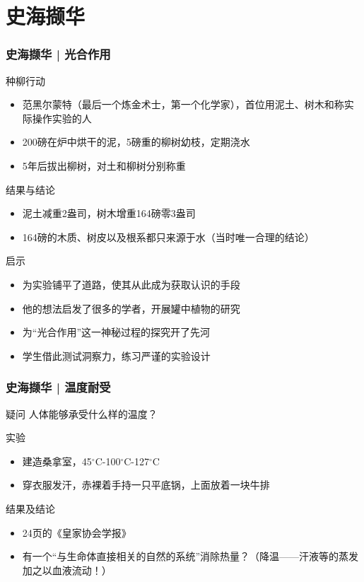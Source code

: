 \section{史海撷华}
\begin{frame}
  \frametitle{史海撷华 | 光合作用}
  \begin{block}{种柳行动}
    \begin{itemize}
      \item 范\textbullet 黑尔蒙特（最后一个炼金术士，第一个化学家），首位用泥土、树木和称实际操作实验的人
      \item 200磅在炉中烘干的泥，5磅重的柳树幼枝，定期浇水
      \item 5年后拔出柳树，对土和柳树分别称重
    \end{itemize}
  \end{block}
  \vspace{-0.75em}
  \pause
  \begin{block}{结果与结论}
    \begin{itemize}
      \item 泥土减重2盎司，树木增重164磅零3盎司
      \item 164磅的木质、树皮以及根系都只来源于水（当时唯一合理的结论）
    \end{itemize}
  \end{block}
  \vspace{-0.75em}
  \pause
  \begin{block}{启示}
    \begin{itemize}
      \item 为\alert{实验}铺平了道路，使其从此成为\alert{获取认识的手段}
      \item 他的想法启发了很多的学者，开展罐中植物的研究
      \item 为“光合作用”这一神秘过程的探究开了先河
      \item 学生借此测试洞察力，练习严谨的实验设计
    \end{itemize}
  \end{block}
\end{frame}

\begin{frame}
  \frametitle{史海撷华 | 温度耐受}
  \begin{block}{疑问}
    人体能够承受什么样的温度？
  \end{block}
  \pause
  \begin{block}{实验}
    \begin{itemize}
      \item 建造桑拿室，45$^{\circ}$C-100$^{\circ}$C-127$^{\circ}$C
      \item 穿衣服发汗，赤裸着手持一只平底锅，上面放着一块牛排
    \end{itemize}
  \end{block}
  \pause
  \begin{block}{结果及结论}
    \begin{itemize}
      \item 24页的《皇家协会学报》
      \item 有一个“与生命体直接相关的自然的系统”消除热量？（降温——汗液等的蒸发加之以血液流动！）
    \end{itemize}
  \end{block}
\end{frame}


